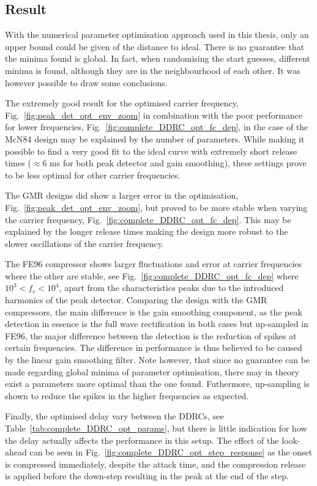 \documentclass[../main2.tex]{subfiles}
\begin{document}
\subsection{Result}\label{discussion_results}
With the numerical parameter optimisation approach used in this thesis, only an upper bound could be given of the distance to ideal. There is no guarantee that the minima found is global. In fact, when randomising the start guesses, different minima is found, although they are in the neighbourhood of each other. It was however possible to draw some conclusions.

The extremely good result for the optimised carrier frequency, Fig.~\ref{fig:peak_det_opt_env_zoom} in combination with the poor performance for lower frequencies, Fig.~\ref{fig:complete_DDRC_opt_fc_dep}, in the case of the McN84 design may be explained by the number of parameters. While making it possible to find a very good fit to the ideal curve with extremely short release times ($\approx 6$ ms for both peak detector and gain smoothing), these settings prove to be less optimal for other carrier frequencies.  

The GMR designs did show a larger error in the optimisation, Fig.~\ref{fig:peak_det_opt_env_zoom}, but proved to be more stable when varying the carrier frequency, Fig.~\ref{fig:complete_DDRC_opt_fc_dep}. This may be explained by the longer release times making the design more robust to the slower oscillations of the carrier frequency. 

The FE96 compressor shows larger fluctuations and error at carrier frequencies where the other are stable, see Fig.~\ref{fig:complete_DDRC_opt_fc_dep} where $10^3<f_c<10^4$, apart from the characteristics peaks due to the introduced harmonics of the peak detector. Comparing the design with the GMR compressors, the main difference is the gain smoothing component, as the peak detection in essence is the full wave rectification in both cases but up-sampled in FE96, the major difference between the detection is the reduction of spikes at certain frequencies. The difference in performance is thus believed to be caused by the linear gain smoothing filter. Note however, that since no guarantee can be made regarding global minima of parameter optimisation, there may in theory exist a parameters more optimal than the one found. Futhermore, up-sampling is shown to reduce the spikes in the higher frequencies as expected. 

Finally, the optimised delay vary between the DDRCs, see Table~\ref{tab:complete_DDRC_opt_params}, but there is little indication for how the delay actually affects the performance in this setup. The effect of the look-ahead can be seen in Fig.~\ref{fig:complete_DDRC_opt_step_response} as the onset is compressed immediately, despite the attack time, and the compression release is applied before the down-step resulting in the peak at the end of the step.
\end{document}
